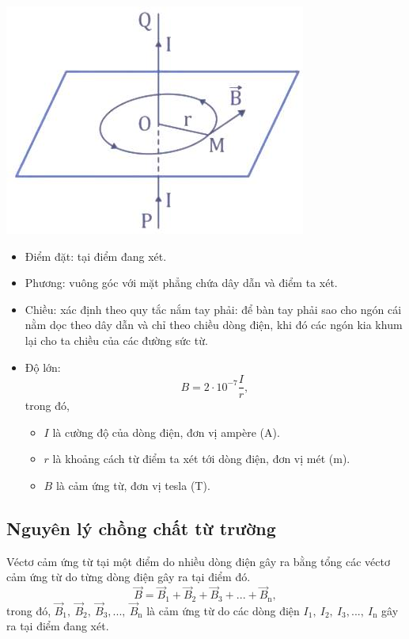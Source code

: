 \begin{center}
	\includegraphics[scale=0.8]{../figs/VN11-PH-26-L-018-1-h83.jpg}
\end{center}
\begin{itemize}
	\item Điểm đặt: tại điểm đang xét.
	\item Phương: vuông góc với mặt phẳng chứa dây dẫn và điểm ta xét.
	\item Chiều: xác định theo quy tắc nắm tay phải: để bàn tay phải sao cho ngón cái nằm dọc theo dây dẫn và chỉ theo chiều dòng điện, khi đó các ngón kia khum lại cho ta chiều của các đường sức từ.
	\item Độ lớn:  
	\begin{equation}
	B=2\cdot 10^{-7}\dfrac{I}{r},
	\end{equation}
	trong đó,
	\begin{itemize}
		\item $I$ là cường độ của dòng điện, đơn vị ampère (A). 
		\item $r$ là khoảng cách từ điểm ta xét tới dòng điện, đơn vị mét (m).
		\item $B$ là cảm ứng từ, đơn vị tesla (T).
	\end{itemize}

\end{itemize}

\subsection{Nguyên lý chồng chất từ trường}
 Véctơ cảm ứng từ tại một điểm do nhiều dòng điện gây ra bằng tổng các véctơ cảm ứng từ do từng dòng điện gây ra tại điểm đó.
\begin{equation}
\vec{B}=\vec{B}_1+\vec{B}_2+\vec{B}_3+...+\vec{B}_\text{n},
\end{equation} 
trong đó, $\vec{B}_1, \ \vec{B}_2, \ \vec{B}_3,..., \ \vec{B}_\text{n}$ là cảm ứng từ do các dòng điện $I_1, \ I_2, \ I_3,..., \ I_\text{n}$ gây ra tại điểm đang xét.


